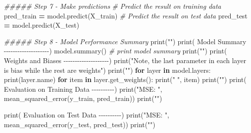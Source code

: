 \documentclass[
  a4paper,
  DIV=11,
  numbers=noendperiod]{scrreprt}
\newenvironment{Shaded}{\begin{snugshade}}{\end{snugshade}}
\newcommand{\BuiltInTok}[1]{#1}
\newcommand{\CommentTok}[1]{\textcolor[rgb]{0.56,0.35,0.01}{\textit{#1}}}
\newcommand{\ControlFlowTok}[1]{\textcolor[rgb]{0.13,0.29,0.53}{\textbf{#1}}}
\newcommand{\KeywordTok}[1]{\textcolor[rgb]{0.13,0.29,0.53}{\textbf{#1}}}
\newcommand{\NormalTok}[1]{#1}
\newcommand{\OperatorTok}[1]{\textcolor[rgb]{0.81,0.36,0.00}{\textbf{#1}}}
\newcommand{\StringTok}[1]{\textcolor[rgb]{0.31,0.60,0.02}{#1}}
\begin{document}
\begin{Shaded}
\begin{Highlighting}[numbers=left,,]
\CommentTok{\#\#\#\#\# Step 7 {-} Make predictions}
\CommentTok{\# Predict the result on training data}
\NormalTok{pred\_train }\OperatorTok{=}\NormalTok{ model.predict(X\_train)}
\CommentTok{\# Predict the result on test data}
\NormalTok{pred\_test }\OperatorTok{=}\NormalTok{ model.predict(X\_test)}

\CommentTok{\#\#\#\#\# Step 8 {-} Model Performance Summary}
\BuiltInTok{print}\NormalTok{(}\StringTok{""}\NormalTok{)}
\BuiltInTok{print}\NormalTok{(}\StringTok{\textquotesingle{}{-}{-}{-}{-}{-}{-}{-}{-}{-}{-}{-}{-}{-}{-}{-}{-}{-}{-}{-}{-} Model Summary {-}{-}{-}{-}{-}{-}{-}{-}{-}{-}{-}{-}{-}{-}{-}{-}{-}{-}{-}{-}\textquotesingle{}}\NormalTok{)}
\NormalTok{model.summary() }\CommentTok{\# print model summary}
\BuiltInTok{print}\NormalTok{(}\StringTok{""}\NormalTok{)}
\BuiltInTok{print}\NormalTok{(}\StringTok{\textquotesingle{}{-}{-}{-}{-}{-}{-}{-}{-}{-}{-}{-}{-}{-}{-}{-}{-}{-}{-}{-}{-} Weights and Biases {-}{-}{-}{-}{-}{-}{-}{-}{-}{-}{-}{-}{-}{-}{-}{-}{-}{-}{-}{-}\textquotesingle{}}\NormalTok{)}
\BuiltInTok{print}\NormalTok{(}\StringTok{"Note, the last parameter in each layer is bias while the rest are weights"}\NormalTok{)}
\BuiltInTok{print}\NormalTok{(}\StringTok{""}\NormalTok{)}
\ControlFlowTok{for}\NormalTok{ layer }\KeywordTok{in}\NormalTok{ model.layers:}
    \BuiltInTok{print}\NormalTok{(layer.name)}
    \ControlFlowTok{for}\NormalTok{ item }\KeywordTok{in}\NormalTok{ layer.get\_weights():}
        \BuiltInTok{print}\NormalTok{(}\StringTok{"  "}\NormalTok{, item)}
\BuiltInTok{print}\NormalTok{(}\StringTok{""}\NormalTok{)}
\BuiltInTok{print}\NormalTok{(}\StringTok{\textquotesingle{}{-}{-}{-}{-}{-}{-}{-}{-}{-}{-} Evaluation on Training Data {-}{-}{-}{-}{-}{-}{-}{-}{-}{-}\textquotesingle{}}\NormalTok{)}
\BuiltInTok{print}\NormalTok{(}\StringTok{"MSE: "}\NormalTok{, mean\_squared\_error(y\_train, pred\_train))}
\BuiltInTok{print}\NormalTok{(}\StringTok{""}\NormalTok{)}

\BuiltInTok{print}\NormalTok{(}\StringTok{\textquotesingle{}{-}{-}{-}{-}{-}{-}{-}{-}{-}{-} Evaluation on Test Data {-}{-}{-}{-}{-}{-}{-}{-}{-}{-}\textquotesingle{}}\NormalTok{)}
\BuiltInTok{print}\NormalTok{(}\StringTok{"MSE: "}\NormalTok{, mean\_squared\_error(y\_test, pred\_test))}
\BuiltInTok{print}\NormalTok{(}\StringTok{""}\NormalTok{)}
\end{Highlighting}
\end{Shaded}
\end{document}
